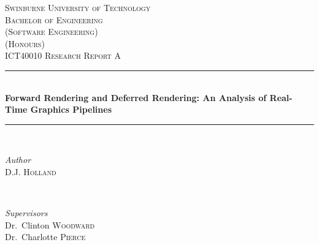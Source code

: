 \begin{titlepage} %
  \newcommand{\HRule}{\rule{\linewidth}{0.5mm}} %

  \center{} %


  \textsc{\LARGE Swinburne University of Technology}\\[1.5cm]

  \textsc{
    \Large
    Bachelor of Engineering\\
    (Software Engineering)\\
    (Honours)
  }\\[0.5cm]

  \textsc{\large ICT40010 Research Report A}\\[0.5cm]


  \HRule{}\\[0.4cm]

  {\huge\bfseries Forward Rendering and Deferred Rendering: An Analysis of Real-Time Graphics Pipelines}\\[0.2cm]

  \HRule{}\\[1.5cm]


  \begin{minipage}{0.4\textwidth}
    \begin{flushleft}
      \large
      \textit{Author}\\
      D.J. \textsc{Holland}
    \end{flushleft}
  \end{minipage}
  {~}
  \begin{minipage}{0.4\textwidth}
    \begin{flushright}
      \large
      \textit{Supervisors}\\
      Dr.\ Clinton \textsc{Woodward}\\
      Dr.\ Charlotte \textsc{Pierce}
    \end{flushright}
  \end{minipage}


\end{titlepage}
